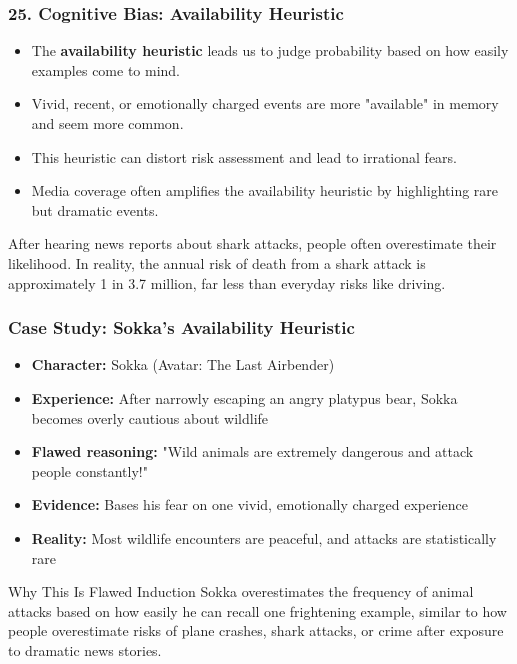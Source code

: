 \documentclass{beamer}
\begin{document}
\begin{frame}
\frametitle{25. Cognitive Bias: Availability Heuristic}
\begin{itemize}
\item The \textbf{availability heuristic} leads us to judge probability based on how easily examples come to mind.
\item Vivid, recent, or emotionally charged events are more "available" in memory and seem more common.
\item This heuristic can distort risk assessment and lead to irrational fears.
\item Media coverage often amplifies the availability heuristic by highlighting rare but dramatic events.
\end{itemize}

\begin{example}
After hearing news reports about shark attacks, people often overestimate their likelihood. In reality, the annual risk of death from a shark attack is approximately 1 in 3.7 million, far less than everyday risks like driving.
\end{example}
\end{frame}

\begin{frame}
    \frametitle{Case Study: Sokka's Availability Heuristic}
    
    \begin{itemize}
    \item \textbf{Character:} Sokka (Avatar: The Last Airbender)
    \item \textbf{Experience:} After narrowly escaping an angry platypus bear, Sokka becomes overly cautious about wildlife
    \item \textbf{Flawed reasoning:} "Wild animals are extremely dangerous and attack people constantly!"
    \item \textbf{Evidence:} Bases his fear on one vivid, emotionally charged experience
    \item \textbf{Reality:} Most wildlife encounters are peaceful, and attacks are statistically rare
    \end{itemize}
    
    \begin{alertblock}{Why This Is Flawed Induction}
    Sokka overestimates the frequency of animal attacks based on how easily he can recall one frightening example, similar to how people overestimate risks of plane crashes, shark attacks, or crime after exposure to dramatic news stories.
    \end{alertblock}
    \end{frame}
\end{document}
